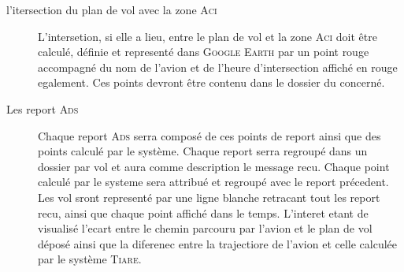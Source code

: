 \begin{description}
    \item[l'itersection du plan de vol avec la zone \textsc{Aci}] L'intersetion, si elle a lieu, entre le plan de vol et la zone \textsc{Aci} doit être calculé, définie et representé dans \textsc{Google Earth} par un point rouge accompagné du nom de l'avion et de l'heure d'intersection affiché en rouge egalement. Ces points devront être contenu dans le dossier du concerné.
    \item[Les report \textsc{Ads}] Chaque report \textsc{Ads} serra composé de ces points de report ainsi que des points calculé par le système. Chaque report serra regroupé dans un dossier par vol et aura comme description le message recu. Chaque point calculé par le systeme sera attribué et regroupé avec le report précedent. Les vol sront representé par une ligne blanche retracant tout les report recu, ainsi que chaque point affiché dans le temps. L'interet etant de visualisé l'ecart entre le chemin parcouru par l'avion et le plan de vol déposé ainsi que la diferenec entre la trajectiore de l'avion et celle calculée par le système \textsc{Tiare}. 
\end{description}
















